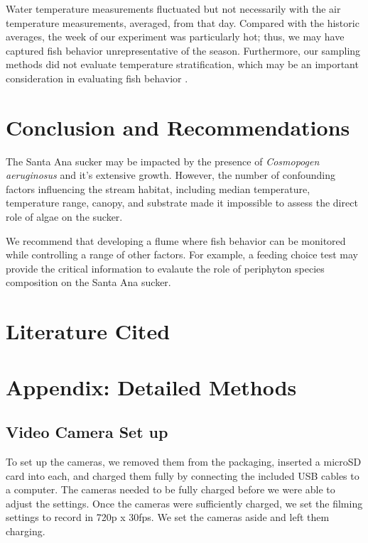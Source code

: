 \documentclass{article}\usepackage[]{graphicx}\usepackage[]{color}
\begin{document}
Water temperature measurements fluctuated but not necessarily with the air temperature measurements, averaged, from that day. Compared with the historic averages, the week of our experiment was particularly hot; thus, we may have captured fish behavior unrepresentative of the season. Furthermore, our sampling methods did not evaluate temperature stratification, which may be an important consideration in evaluating fish behavior \citet{sadler1980effect, matthews1994cool}.

\section{Conclusion and Recommendations}

The Santa Ana sucker may be impacted by the presence of \emph{Cosmopogen aeruginosus} and it's extensive growth. However, the number of confounding factors influencing the stream habitat, including median temperature, temperature range, canopy, and substrate made it impossible to assess the direct role of algae on the sucker. 

We recommend that developing a flume where fish behavior can be monitored while controlling a range of other factors. For example, a feeding choice test may provide the critical information to evalaute the role of periphyton species composition on the Santa Ana sucker.

\section{Literature Cited}



\newpage
\section{Appendix: Detailed Methods}

\subsection{Video Camera Set up}

To set up the cameras, we removed them from the packaging, inserted a microSD card into each, and charged them fully by connecting the included USB cables to a computer. The cameras needed to be fully charged before we were able to adjust the settings. Once the cameras were sufficiently charged, we set the filming settings to record in 720p x 30fps. We set the cameras aside and left them charging. 
\end{document}
